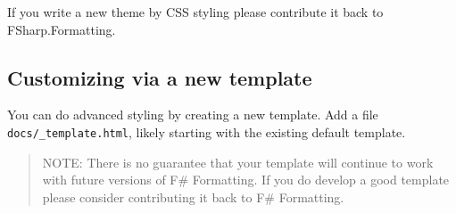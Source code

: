 \documentclass{article}
\begin{document}
If you write a new theme by CSS styling please contribute it back to FSharp.Formatting.
\subsection*{Customizing via a new template}



You can do advanced styling by creating a new template.  Add a file \texttt{docs/\_template.html}, likely starting
with the existing default template.
\begin{quote}


NOTE: There is no guarantee that your template will continue to work with future versions of F\# Formatting.
If you do develop a good template please consider contributing it back to F\# Formatting.
\end{quote}
\end{document}
